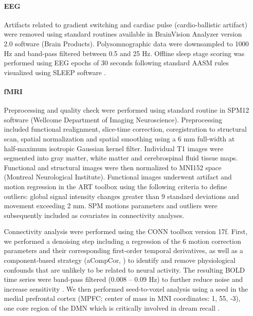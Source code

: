 \paragraph{EEG}
Artifacts related to gradient switching and cardiac pulse (cardio-ballistic artifact) were removed using standard routines available in BrainVision Analyzer version 2.0 software (Brain Products). Polysomnographic data were downsampled to 1000 Hz and band-pass filtered between 0.5 and 25 Hz. Offline sleep stage scoring was performed using EEG epochs of 30 seconds following standard AASM rules \citep{iber_aasm_2007} visualized using SLEEP software \citep{combrisson_sleep:_2017}.

\paragraph{fMRI}
Preprocessing and quality check were performed using standard routine in SPM12 software (Wellcome Department of Imaging Neuroscience). Preprocessing included functional realignment, slice-time correction, coregistration to structural scan, spatial normalization and spatial smoothing using a 6 mm full-width at half-maximum isotropic Gaussian kernel filter. Individual T1 images were segmented into gray matter, white matter and cerebrospinal fluid tissue maps. Functional and structural images were then normalized to MNI152 space (Montreal Neurological Institute). Functional images underwent artifact and motion regression in the ART toolbox using the following criteria to define outliers: global signal intensity changes greater than 9 standard deviations and movement exceeding 2 mm. SPM motions parameters and outliers were subsequently included as covariates in connectivity analyses.

Connectivity analysis were performed using the CONN toolbox version 17f. First, we performed a denoising step including a regression of the 6 motion correction parameters and their corresponding first-order temporal derivatives, as well as a component-based strategy (aCompCor, \citealp{behzadi_component_2007}) to identify and remove physiological confounds that are unlikely to be related to neural activity. The resulting BOLD time series were band-pass filtered (0.008 – 0.09 Hz) to further reduce noise and increase sensitivity \citep{weissenbacher_correlations_2009}. We then performed seed-to-voxel analysis using a seed in the medial prefrontal cortex (MPFC; center of mass in MNI coordinates: 1, 55, -3), one core region of the DMN which is critically involved in dream recall \citep{solms_neuropsychology_1997, eichenlaub_brain_2014}.

